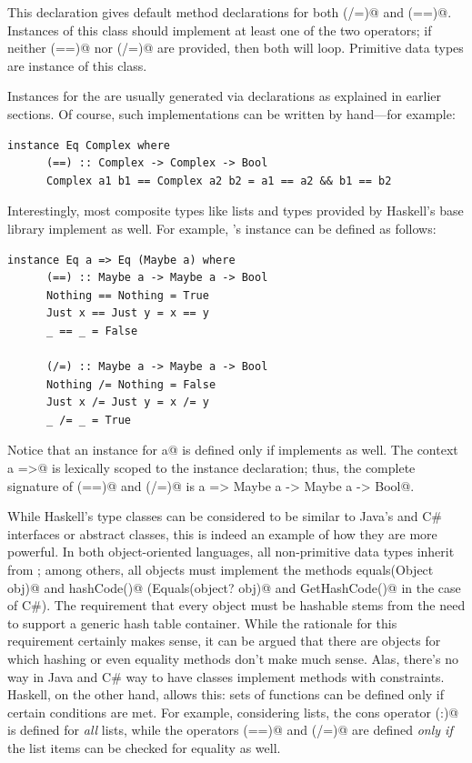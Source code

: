 \documentclass[UdineBachThesis,american,11pt]{PhdThesis}
\begin{document}
  This declaration gives default method declarations for both \lstinline@(/=)@
  and \lstinline@(==)@. Instances of this class should implement at least one of
  the two operators; if neither \lstinline@(==)@ nor \lstinline@(/=)@ are
  provided, then both will loop. Primitive data types are instance of this
  class.

  Instances for the \lstinline@Eq@ are usually generated via
  \lstinline@deriving@ declarations as explained in earlier sections. Of course,
  such implementations can be written by hand---for example:

  \begin{lstlisting}[gobble=4,basicstyle=\ttfamily\small]
    instance Eq Complex where
      (==) :: Complex -> Complex -> Bool
      Complex a1 b1 == Complex a2 b2 = a1 == a2 && b1 == b2
  \end{lstlisting}

  Interestingly, most composite types like lists and types provided by Haskell's
  base library implement \lstinline@Eq@ as well. For example,
  \lstinline@Maybe@'s instance can be defined as follows:

  \begin{lstlisting}[gobble=4,basicstyle=\ttfamily\small]
    instance Eq a => Eq (Maybe a) where
      (==) :: Maybe a -> Maybe a -> Bool
      Nothing == Nothing = True
      Just x == Just y = x == y
      _ == _ = False

      (/=) :: Maybe a -> Maybe a -> Bool
      Nothing /= Nothing = False
      Just x /= Just y = x /= y
      _ /= _ = True
  \end{lstlisting}

  Notice that an \lstinline@Eq@ instance for \lstinline@Maybe a@ is defined only
  if \lstinline@a@ implements \lstinline@Eq@ as well. The context
  \lstinline@Eq a =>@ is lexically scoped to the instance declaration; thus, the
  complete signature of \lstinline@(==)@ and \lstinline@(/=)@ is
  \lstinline@Eq a => Maybe a -> Maybe a -> Bool@.

  While Haskell's type classes can be considered to be similar to Java's and C\#
  interfaces or abstract classes, this is indeed an example of how they are more
  powerful. In both object-oriented languages, all non-primitive data types
  inherit from \lstinline@Object@; among others, all objects must implement the
  methods \lstinline@boolean equals(Object obj)@ and \lstinline@int hashCode()@
  (\lstinline@bool Equals(object? obj)@ and \lstinline@int GetHashCode()@ in the
  case of C\#). The requirement that every object must be hashable stems from
  the need to support a generic hash table container. While the rationale for
  this requirement certainly makes sense, it can be argued that there are
  objects for which hashing or even equality methods don't make much sense.
  Alas, there's no way in Java and C\# way to have classes implement methods
  with constraints. Haskell, on the other hand, allows this: sets of functions
  can be defined only if certain conditions are met. For example, considering
  lists, the cons operator \lstinline@(:)@ is defined for \emph{all} lists,
  while the operators \lstinline@(==)@ and \lstinline@(/=)@ are defined
  \emph{only if} the list items can be checked for equality as well.
\end{document}
